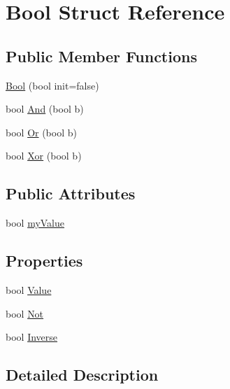 \hypertarget{struct_bool}{\section{Bool Struct Reference}
\label{struct_bool}
}
\subsection*{Public Member Functions}
\begin{DoxyCompactItemize}
\item 
\hyperlink{struct_bool_adfa392e25e49fa380805cdc3e720db4c}{Bool} (bool init=false)
\item 
bool \hyperlink{struct_bool_aa8673143ee9773e4179568c7a0b750e0}{And} (bool b)
\item 
bool \hyperlink{struct_bool_a06d2286fa15c689ce13c9572591712e1}{Or} (bool b)
\item 
bool \hyperlink{struct_bool_a3ee01384c4fc57177fd99f77a85345ff}{Xor} (bool b)
\end{DoxyCompactItemize}
\subsection*{Public Attributes}
\begin{DoxyCompactItemize}
\item 
bool \hyperlink{struct_bool_a66ba58e525f8d28f05655f36ffb9ceed}{my\+Value}
\end{DoxyCompactItemize}
\subsection*{Properties}
\begin{DoxyCompactItemize}
\item 
bool \hyperlink{struct_bool_a70bc573da6ea3bb93da5de3e442ada19}{Value}
\item 
bool \hyperlink{struct_bool_ab80004af3dcb164ab2876b76a6b10936}{Not}
\item 
bool \hyperlink{struct_bool_aa94cd09bc0530f4bf17d1a8f9bf55280}{Inverse}
\end{DoxyCompactItemize}


\subsection{Detailed Description}


